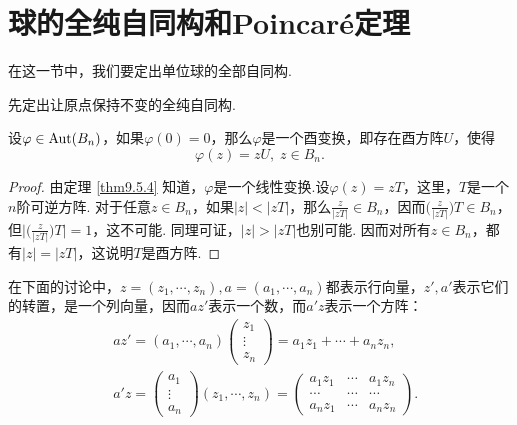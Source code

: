 \section{球的全纯自同构和Poincar\'e定理\label{sec9.6}}
在这一节中，我们要定出单位球的全部自同构.

先定出让原点保持不变的全纯自同构.
\begin{theorem}\label{thm9.6.1}
  设$\varphi\in\operatorname{Aut}(B_n)$，如果$\varphi(0)=0$，那么$\varphi$是一个酉变换，即存在酉方阵$U$，使得
  \[
    \varphi(z) = zU,\;z\in B_n.
  \]
\end{theorem}
\begin{proof}
  由定理 \ref{thm9.5.4} 知道，$\varphi$是一个线性变换.设$\varphi(z)=zT$，这里，$T$是一个$n$阶可逆方阵. 对于任意$z\in B_n$，如果$|z|<|zT|$，那么$\frac z{|zT|}\in B_n$，因而$\bigg(\frac z{|zT|}\bigg)T\in B_n$，但$\bigg|\bigg(\frac z{|zT|}\bigg)T\bigg|=1$，这不可能. 同理可证，$|z|>|zT|$也别可能. 因而对所有$z\in B_n$，都有$|z|=|zT|$，这说明$T$是酉方阵.
\end{proof}

在下面的讨论中，$z=(z_1,\cdots,z_n),a=(a_1,\cdots,a_n)$都表示行向量，$z',a'$表示它们的转置，是一个列向量，因而$az'$表示一个数，而$a'z$表示一个方阵：
\begin{align*}
  & az' = (a_1,\cdots,a_n)
    \begin{pmatrix}
      z_1 \\ \vdots \\ z_n
    \end{pmatrix}
    = a_1z_1 + \cdots + a_nz_n,\\
    & a'z =
    \begin{pmatrix}
      a_1 \\ \vdots \\ a_n
    \end{pmatrix}(z_1,\cdots,z_n) =
    \begin{pmatrix}
      a_1z_1 & \cdots & a_1z_n\\
      \cdots & \cdots & \cdots\\
      a_nz_1 & \cdots & a_nz_n
    \end{pmatrix}.
\end{align*}

